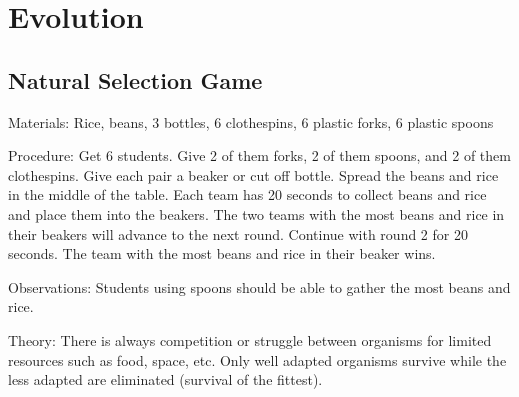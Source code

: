 \section{Evolution}

\begin{multicols}{2}




\subsection{Natural Selection Game} %


\begin{description*}
\item[Materials:]{Rice, beans, 3 bottles, 6 clothespins, 6 plastic forks, 6 plastic spoons}
\item[Procedure:]{Get 6 students. Give 2 of them forks, 2 of them spoons, and 2 of them clothespins. Give each pair a beaker or cut off bottle. Spread the beans and rice in the middle of the table. Each team has 20 seconds to collect beans and rice and place them into the beakers. The two teams with the most beans and rice in their beakers will advance to the next round. Continue with round 2 for 20 seconds. The team with the most beans and rice in their beaker wins.}
\item[Observations:]{Students using spoons should be able to gather the most beans and rice.}
\item[Theory:]{There is always competition or struggle between organisms for limited resources such as food, space, etc. Only well adapted organisms survive while the less adapted are eliminated (survival of the fittest).}
\end{description*}



\end{multicols}

\pagebreak